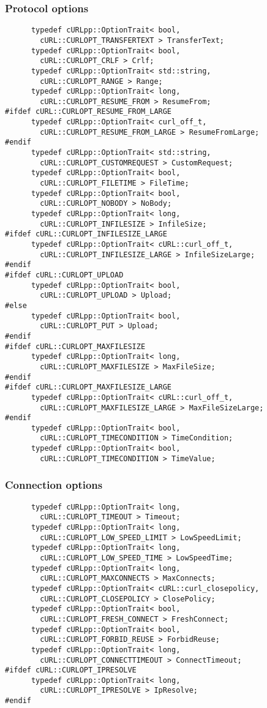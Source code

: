 \documentclass{article}
\begin{document}
\subsubsection{Protocol options}
\begin{verbatim}
      typedef cURLpp::OptionTrait< bool, 
        cURL::CURLOPT_TRANSFERTEXT > TransferText;
      typedef cURLpp::OptionTrait< bool, 
        cURL::CURLOPT_CRLF > Crlf;
      typedef cURLpp::OptionTrait< std::string, 
        cURL::CURLOPT_RANGE > Range;
      typedef cURLpp::OptionTrait< long, 
        cURL::CURLOPT_RESUME_FROM > ResumeFrom;
#ifdef cURL::CURLOPT_RESUME_FROM_LARGE
      typedef cURLpp::OptionTrait< curl_off_t, 
        cURL::CURLOPT_RESUME_FROM_LARGE > ResumeFromLarge;
#endif
      typedef cURLpp::OptionTrait< std::string, 
        cURL::CURLOPT_CUSTOMREQUEST > CustomRequest;
      typedef cURLpp::OptionTrait< bool, 
        cURL::CURLOPT_FILETIME > FileTime;
      typedef cURLpp::OptionTrait< bool, 
        cURL::CURLOPT_NOBODY > NoBody;
      typedef cURLpp::OptionTrait< long, 
        cURL::CURLOPT_INFILESIZE > InfileSize;
#ifdef cURL::CURLOPT_INFILESIZE_LARGE
      typedef cURLpp::OptionTrait< cURL::curl_off_t, 
        cURL::CURLOPT_INFILESIZE_LARGE > InfileSizeLarge;
#endif
#ifdef cURL::CURLOPT_UPLOAD
      typedef cURLpp::OptionTrait< bool, 
        cURL::CURLOPT_UPLOAD > Upload;
#else
      typedef cURLpp::OptionTrait< bool, 
        cURL::CURLOPT_PUT > Upload;
#endif
#ifdef cURL::CURLOPT_MAXFILESIZE
      typedef cURLpp::OptionTrait< long, 
        cURL::CURLOPT_MAXFILESIZE > MaxFileSize;
#endif
#ifdef cURL::CURLOPT_MAXFILESIZE_LARGE
      typedef cURLpp::OptionTrait< cURL::curl_off_t, 
        cURL::CURLOPT_MAXFILESIZE_LARGE > MaxFileSizeLarge;
#endif
      typedef cURLpp::OptionTrait< bool, 
        cURL::CURLOPT_TIMECONDITION > TimeCondition;
      typedef cURLpp::OptionTrait< bool, 
        cURL::CURLOPT_TIMECONDITION > TimeValue;
\end{verbatim}

\subsubsection{Connection options}
\begin{verbatim}       
      typedef cURLpp::OptionTrait< long, 
        cURL::CURLOPT_TIMEOUT > Timeout;
      typedef cURLpp::OptionTrait< long, 
        cURL::CURLOPT_LOW_SPEED_LIMIT > LowSpeedLimit;
      typedef cURLpp::OptionTrait< long, 
        cURL::CURLOPT_LOW_SPEED_TIME > LowSpeedTime;
      typedef cURLpp::OptionTrait< long, 
        cURL::CURLOPT_MAXCONNECTS > MaxConnects;
      typedef cURLpp::OptionTrait< cURL::curl_closepolicy, 
        cURL::CURLOPT_CLOSEPOLICY > ClosePolicy;
      typedef cURLpp::OptionTrait< bool, 
        cURL::CURLOPT_FRESH_CONNECT > FreshConnect;
      typedef cURLpp::OptionTrait< bool, 
        cURL::CURLOPT_FORBID_REUSE > ForbidReuse;
      typedef cURLpp::OptionTrait< long, 
        cURL::CURLOPT_CONNECTTIMEOUT > ConnectTimeout;
#ifdef cURL::CURLOPT_IPRESOLVE
      typedef cURLpp::OptionTrait< long, 
        cURL::CURLOPT_IPRESOLVE > IpResolve;
#endif
\end{verbatim}
\end{document}

